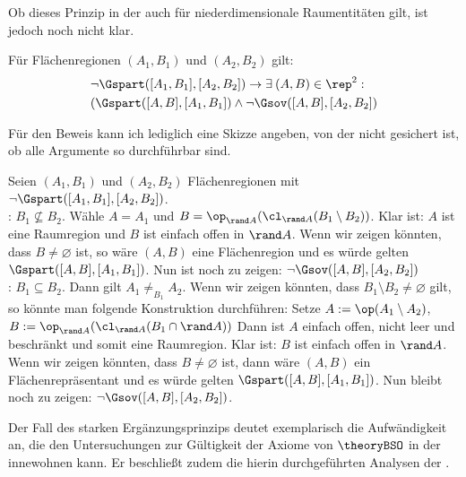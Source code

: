 %
    Ob dieses Prinzip in der \strukt auch für niederdimensionale Raumentitäten gilt, ist jedoch noch nicht klar.
%
    \begin{hyp}
        Für Flächenregionen $(A_1,B_1)$ und $(A_2,B_2)$ gilt: 
        \begin{align*}
            &\neg \Gspart([A_1,B_1],[A_2,B_2]) \to \exists\: (A,B) \in  \rep^2:\\
            &(\Gspart([A,B],[A_1,B_1]) \wedge \neg \Gsov([A,B],[A_2,B_2])
        \end{align*}
    \end{hyp}
%
    Für den Beweis kann ich lediglich eine Skizze angeben, von der nicht gesichert ist, ob alle Argumente so durchführbar sind.
%
    \begin{bewidee}
        Seien $(A_1,B_1)$ und $(A_2,B_2)$ Flächenregionen mit $\neg \Gspart([A_1,B_1],[A_2,B_2])$.\\
    
        : $B_1 \nsubseteq B_2$. 
            Wähle $A = A_1$ und $B = \op_{\rand A}(\cl_{\rand A}(B_1 \setminus B_2))$.
            Klar ist: $A$ ist eine Raumregion und $B$ ist einfach offen in $\rand A$.
            Wenn wir zeigen könnten, dass $B \neq \varnothing$ ist, so wäre $(A,B)$ eine Flächenregion und es würde gelten $\Gspart([A,B],[A_1,B_1])$.
            Nun ist noch zu zeigen: $\neg \Gsov([A,B],[A_2,B_2])$\\
        
        : $B_1 \subseteq B_2$.
            Dann gilt $A_1 \neq_{B_1} A_2$.
            Wenn wir zeigen könnten, dass $B_1 \setminus B_2 \neq \varnothing$ gilt, so könnte man folgende Konstruktion durchführen:
            Setze $A := \op(A_1 \setminus A_2)$, $B := \op_{\rand A}(\cl_{\rand A}(B_1 \cap \rand A))$
            Dann ist $A$ einfach offen, nicht leer und beschränkt und somit eine Raumregion.
            Klar ist: $B$ ist einfach offen in $\rand A$. 
            Wenn wir zeigen könnten, dass $B \neq \varnothing$ ist, dann wäre $(A,B)$ ein Flächenrepräsentant und es würde gelten $\Gspart([A,B],[A_1,B_1])$.
            Nun bleibt noch zu zeigen: $\neg \Gsov([A,B],[A_2,B_2])$.
                
    \end{bewidee}
%
Der Fall des starken Ergänzungsprinzips deutet exemplarisch die Aufwändigkeit an,
die den Untersuchungen zur Gültigkeit der Axiome von $\theoryBSO$ in der \strukt innewohnen kann.
Er beschließt zudem die hierin durchgeführten Analysen der \strukt.
 
    



